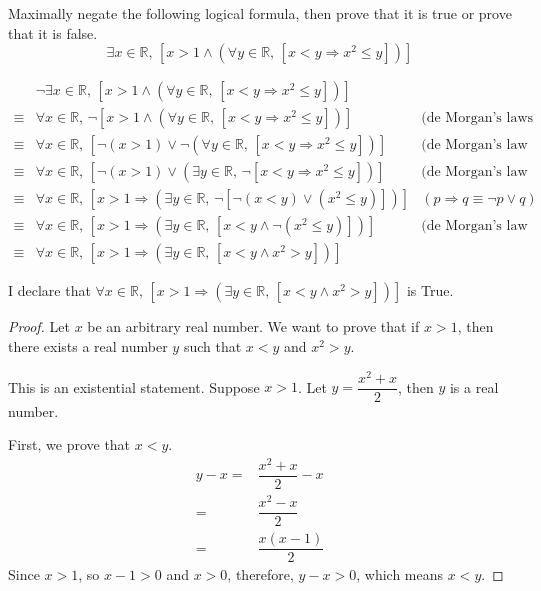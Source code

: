 \begin{exercise}
Maximally negate the following logical formula, then prove that it is true or prove that it is false.
\[ \exists x \in \mathbb{R},\, [x > 1 \wedge (\forall y \in \mathbb{R},\, [x < y \Rightarrow x^2 \le y])]\]
\end{exercise}

\begin{solutions*}
    \fixlistskip
    \begin{align*}
        &\neg \exists x \in \mathbb{R},\, [x > 1 \wedge (\forall y \in \mathbb{R},\, [x < y \Rightarrow x^2 \le y])] \\
        \equiv &\forall x \in \mathbb{R},\, \neg [x > 1 \wedge (\forall y \in \mathbb{R},\, [x < y \Rightarrow x^2 \le y])] & \text{(de Morgan's laws for quantifiers)}\\
        \equiv &\forall x \in \mathbb{R},\, [\neg (x > 1) \vee \neg (\forall y \in \mathbb{R},\, [x < y \Rightarrow x^2 \le y])] & \text{(de Morgan's law for logical operators)}\\
        \equiv &\forall x \in \mathbb{R},\, [\neg (x > 1) \vee (\exists y \in \mathbb{R},\, \neg [x < y \Rightarrow x^2 \le y])] & \text{(de Morgan's law for quantifiers)}\\
        \equiv &\forall x \in \mathbb{R},\, [x > 1 \Rightarrow (\exists y \in \mathbb{R},\, \neg[\neg(x < y) \vee (x^2 \le y)])] & (p \Rightarrow q \equiv \neg p \vee q)\\
        \equiv &\forall x \in \mathbb{R},\, [x > 1 \Rightarrow (\exists y \in \mathbb{R},\, [x < y \wedge \neg (x^2 \le y)])] & \text{(de Morgan's law for logical operators)}\\
        \equiv &\forall x \in \mathbb{R},\, [x > 1 \Rightarrow (\exists y \in \mathbb{R},\, [x < y \wedge x^2 > y])]
    \end{align*}

    I declare that $\forall x \in \mathbb{R},\, [x > 1 \Rightarrow (\exists y \in \mathbb{R},\, [x < y \wedge x^2 > y])]$ is True.

    \begin{proof}
        Let $x$ be an arbitrary real number. We want to prove that if $x > 1$, then there exists a real number $y$ such that $x < y$ and $x^2 > y$.

        This is an existential statement. Suppose $x > 1$. Let $y = \dfrac{x^2 + x}{2}$, then $y$ is a real number. 
        
        First, we prove that $x < y$.
        \begin{align*}
            y-x =& \dfrac{x^2 + x}{2} - x\\
            =& \dfrac{x^2 - x}{2}\\
            =& \dfrac{x(x-1)}{2}
        \end{align*}
        Since $x > 1$, so $x-1 > 0$ and $x > 0$, therefore, $y-x > 0$, which means $x < y$.


\end{proof}
\end{solutions*}
